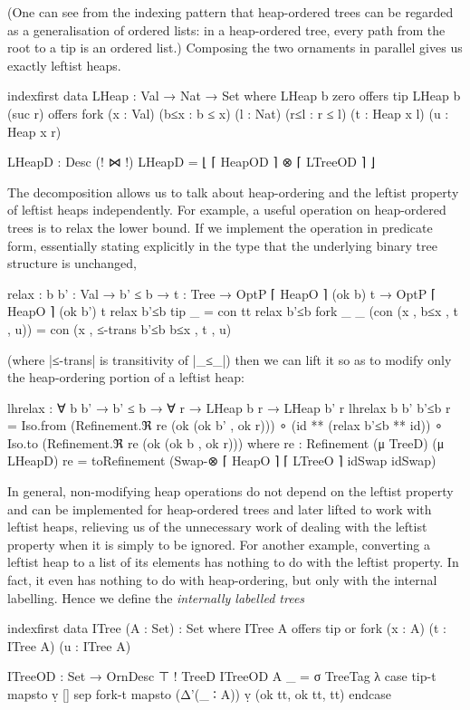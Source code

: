 (One can see from the indexing pattern that heap-ordered trees can be regarded as a generalisation of ordered lists: in a heap-ordered tree, every path from the root to a tip is an ordered list.)
Composing the two ornaments in parallel gives us exactly leftist heaps.
\begin{code}
indexfirst data LHeap : Val → Nat → Set where
  LHeap b zero     offers  tip
  LHeap b (suc r)  offers  fork  (x : Val) (b≤x : b ≤ x)
                                 (l : Nat) (r≤l : r ≤ l) (t : Heap x l) (u : Heap x r)
                 
LHeapD : Desc (! ⋈ !)
LHeapD = ⌊ ⌈ HeapOD ⌉ ⊗ ⌈ LTreeOD ⌉ ⌋
\end{code}
The decomposition allows us to talk about heap-ordering and the leftist property of leftist heaps independently.
For example, a useful operation on heap-ordered trees is to relax the lower bound.
If we implement the operation in predicate form, essentially stating explicitly in the type that the underlying binary tree structure is unchanged,
\begin{code}
relax :  {b b' : Val} → b' ≤ b →
         {t : Tree} → OptP ⌈ HeapO ⌉ (ok b) t → OptP ⌈ HeapO ⌉ (ok b') t
relax b'≤b {tip}       _                        =  con tt
relax b'≤b {fork _ _}  (con (x , b≤x , t , u))  =  con (x , ≤-trans b'≤b b≤x , t , u)
\end{code}
(where |≤-trans| is transitivity of |_≤_|) then we can lift it so as to modify only the heap-ordering portion of a leftist heap:
\begin{code}
lhrelax : ∀ {b b'} → b' ≤ b → ∀ {r} → LHeap b r → LHeap b' r
lhrelax {b} {b'} b'≤b {r} =
  Iso.from (Refinement.ℜ re (ok (ok b' , ok r))) ∘
    (id ** (relax b'≤b ** id)) ∘ Iso.to (Refinement.ℜ re (ok (ok b , ok r)))
  where
    re : Refinement (μ TreeD) (μ LHeapD)
    re = toRefinement (Swap-⊗ ⌈ HeapO ⌉ ⌈ LTreeO ⌉ idSwap idSwap)
\end{code}
In general, non-modifying heap operations do not depend on the leftist property and can be implemented for heap-ordered trees and later lifted to work with leftist heaps, relieving us of the unnecessary work of dealing with the leftist property when it is simply to be ignored.
For another example, converting a leftist heap to a list of its elements has nothing to do with the leftist property.
In fact, it even has nothing to do with heap-ordering, but only with the internal labelling.
Hence we define the \emph{internally labelled trees}
\begin{code}
indexfirst data ITree (A : Set) : Set where
  ITree A  offers  tip
           or      fork (x : A) (t : ITree A) (u : ITree A)

ITreeOD : Set → OrnDesc ⊤ ! TreeD
ITreeOD A _ = σ TreeTag  λ  case  tip-t   mapsto  ṿ []
                            sep   fork-t  mapsto  (Δ'(_ ∶ A)) ṿ (ok tt, ok tt, tt) endcase
\end{code}
